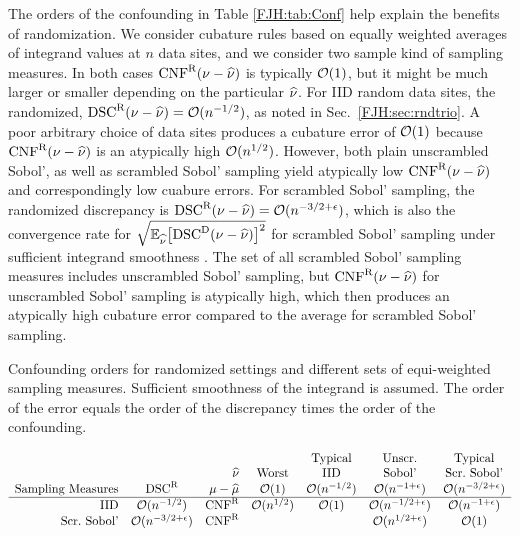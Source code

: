 \documentclass[graybox,footinfo]{svmult}
\begin{document}
The orders of the confounding in Table \ref{FJH:tab:Conf} help explain the 
benefits of randomization.  We consider cubature rules based on equally weighted 
averages of integrand values at $n$ data sites, and we consider two sample kind of 
sampling measures.  In both cases $\textup{CNF}^{\textup{R}}(\nu - \widehat{\nu})$ is 
typically ${\mathcal{O}}(1)$, but it might be much larger or smaller depending on the particular 
$\widehat{\nu}$.  For IID random data sites, the 
randomized, $\textup{DSC}^{\textup{R}}(\nu - \widehat{\nu}) = {\mathcal{O}}(n^{-1/2})$, as noted in Sec.\ 
\ref{FJH:sec:rndtrio}.  A poor 
arbitrary choice of data sites produces a cubature error of ${\mathcal{O}}(1)$ because 
$\textup{CNF}^{\textup{R}}(\nu - \widehat{\nu})$ is an atypically high ${\mathcal{O}}(n^{1/2})$.  
However, both plain unscrambled Sobol', as well as scrambled Sobol' sampling yield 
atypically low $\textup{CNF}^{\textup{R}}(\nu - \widehat{\nu})$ and correspondingly low cuabure errors.  For 
scrambled Sobol' sampling, the randomized discrepancy is $\textup{DSC}^{\textup{R}}(\nu - \widehat{\nu}) 
={\mathcal{O}}(n^{-3/2 + 
\epsilon})$, which is also the convergence rate for $\sqrt{{\mathbb{E}}_{\widehat{\nu}}\bigl[\textup{DSC}^{\textup{D}}(\nu - 
\widehat{\nu})\bigr ]^2}$ for scrambled 
Sobol' sampling under sufficient integrand smoothness \cite{HicHon98a, HicYue00}.
The set of all scrambled Sobol' sampling measures includes 
unscrambled 
Sobol' 
sampling, but $\textup{CNF}^{\textup{R}}(\nu - \widehat{\nu})$ for unscrambled Sobol' sampling is atypically high, 
which then produces an atypically high
cubature error compared to the average for scrambled Sobol' sampling.

\begin{table}
	\caption{Confounding orders for randomized settings and 
		different sets of equi-weighted 
		sampling measures. Sufficient smoothness of the integrand is assumed.
		The order of the error equals the order of the discrepancy times the 
		order of the confounding. \label{FJH:tab:Conf}}
	\begin{equation*}
	\begin{array}{r@{\quad }c@{\quad }r@{\quad}c@{\quad}c@{\quad}c@{\quad}c}
	&&&&\text{Typical} &  \textup{Unscr.} &\text{Typical}\\
	\multicolumn{3}{r@{\quad}}{\hnu} &  \textup{Worst} &  \textup{IID} &
	\textup{Sobol'}&  \textup{Scr.\ Sobol'}\\
	\textup{Sampling Measures} & \disc^\Rn & \mu - \hmu & \calO(1) & \calO(n^{-1/2}) & 
	\calO(n^{-1+\epsilon}) & 
	\calO(n^{-3/2+\epsilon})\\
	\hline 
	\textup{IID} & \calO(n^{-1/2}) & \algn^\Rn & \calO(n^{1/2})  & \calO(1) 
	&\calO(n^{-1/2+\epsilon}) &\calO(n^{-1+\epsilon}) \\
	\textup{Scr.\ Sobol'} &\calO(n^{-3/2+\epsilon}) & \algn^\Rn 
	& & &\calO(n^{1/2+\epsilon})&\calO(1) 
	\end{array}
	\end{equation*}
\end{table}
\end{document}
